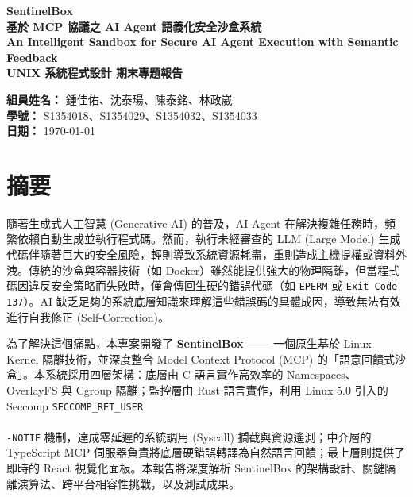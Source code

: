 \documentclass[12pt, a4paper, twoside]{article}
\begin{document}
\begin{titlepage}
    \centering
    \vspace*{2cm}
    {\Huge \textbf{SentinelBox}}\\[1cm]
    {\LARGE \textbf{基於 MCP 協議之 AI Agent 語義化安全沙盒系統}}\\[1.5cm]
    {\large \textbf{An Intelligent Sandbox for Secure AI Agent Execution with Semantic Feedback}}\\[3cm]
    
    {\Large \textbf{UNIX 系統程式設計 期末專題報告}}\\[4cm]
    
    \vfill
    \begin{flushright}
        {\large \textbf{組員姓名：} 鍾佳佑、沈泰瑒、陳泰銘、林政崴}\\
        {\large \textbf{學號：} S1354018、S1354029、S1354032、S1354033}\\
        {\large \textbf{日期：} \today}
    \end{flushright}
\end{titlepage}

\newpage
{}
\section*{摘要}
隨著生成式人工智慧 (Generative AI) 的普及，AI Agent 在解決複雜任務時，頻繁依賴自動生成並執行程式碼。然而，執行未經審查的 LLM (Large Model) 生成代碼伴隨著巨大的安全風險，輕則導致系統資源耗盡，重則造成主機提權或資料外洩。傳統的沙盒與容器技術（如 Docker）雖然能提供強大的物理隔離，但當程式碼因違反安全策略而失敗時，僅會傳回生硬的錯誤代碼（如 \texttt{EPERM} 或 \texttt{Exit Code 137}）。AI 缺乏足夠的系統底層知識來理解這些錯誤碼的具體成因，導致無法有效進行自我修正 (Self-Correction)。

為了解決這個痛點，本專案開發了 \textbf{SentinelBox} —— 一個原生基於 Linux Kernel 隔離技術，並深度整合 Model Context Protocol (MCP) 的「語意回饋式沙盒」。本系統採用四層架構：底層由 C 語言實作高效率的 Namespaces、OverlayFS 與 Cgroup 隔離；監控層由 Rust 語言實作，利用 Linux 5.0 引入的 Seccomp \texttt{SECCOMP\_RET\_USER\\\\-NOTIF} 機制，達成零延遲的系統調用 (Syscall) 攔截與資源遙測；中介層的 TypeScript MCP 伺服器負責將底層硬錯誤轉譯為自然語言回饋；最上層則提供了即時的 React 視覺化面板。本報告將深度解析 SentinelBox 的架構設計、關鍵隔離演算法、跨平台相容性挑戰，以及測試成果。
\end{document}
